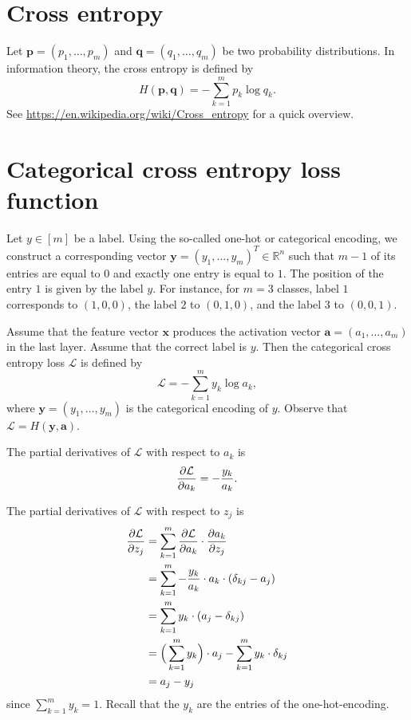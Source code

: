 \documentclass[12pt]{article}
\newcommand{\R}{\mathbb{R}}
\newcommand{\x}{\boldsymbol{x}}
\newcommand{\y}{\boldsymbol{y}}
\begin{document}
\section{Cross entropy}

Let $\boldsymbol{p}=(p_1,\ldots,p_m)$ and $\boldsymbol{q}=(q_1,\ldots,q_m)$ be two probability distributions. In information theory, the cross entropy is defined by
\begin{equation}
H(\boldsymbol{p},\boldsymbol{q}) = - \sum_{k=1}^m p_k \log q_k.
\end{equation}
See \url{https://en.wikipedia.org/wiki/Cross_entropy} for a quick overview.

\section{Categorical cross entropy loss function}

Let $y\in[m]$ be a label. Using the so-called one-hot or categorical encoding, we construct a corresponding vector $\boldsymbol{y}=(y_1,\ldots,y_m)^T\in\R^n$ such that $m-1$ of its entries are equal to $0$ and exactly one entry is equal to $1$. The position of the entry $1$ is given by the label $y$. For instance, for $m=3$ classes, label $1$ corresponds to $(1,0,0)$, the label $2$ to $(0,1,0)$, and the label $3$ to $(0,0,1)$.

Assume that the feature vector $\x$ produces the activation vector $\boldsymbol{a}=(a_1,\ldots,a_m)$ in the last layer. Assume that the correct label is $y$. Then the categorical cross entropy loss $\mathcal{L}$ is defined by
\begin{equation}
\mathcal{L} = -\sum_{k=1}^m y_k \log a_k,
\end{equation}
where $\y=(y_1,\ldots,y_m)$ is the categorical encoding of $y$. Observe that $\mathcal{L}=H(\y,\boldsymbol{a})$.

The partial derivatives of $\mathcal{L}$ with respect to $a_k$ is
\begin{equation}
{\partial \mathcal{L} \over \partial a_k} = -\frac{y_k}{a_k}.
\end{equation}

The partial derivatives of $\mathcal{L}$ with respect to $z_j$ is
\begin{align}
{\partial \mathcal{L} \over \partial z_j} 
&=
\sum_{k=1}^m {\partial \mathcal{L} \over \partial a_k} \cdot {\partial a_k \over \partial z_j} \\
&= 
\sum_{k=1}^m -\frac{y_k}{a_k} \cdot a_k \cdot (\delta_{kj} - a_j)  \\
&= 
\sum_{k=1}^m y_k \cdot (a_j - \delta_{kj}) \\
&=
\Big(\sum_{k=1}^m  y_k \Big) \cdot a_j - \sum_{k=1}^m  y_k \cdot \delta_{kj} \\
&=
a_j - y_j
\end{align}
since $\sum_{k=1}^m  y_k = 1$. Recall that the $y_k$ are the entries of the one-hot-encoding.
\end{document}

